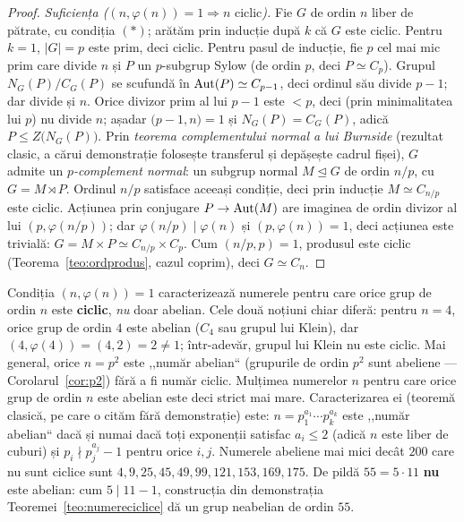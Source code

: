 \begin{proof}
\smallskip
\emph{Suficiența (}$(n,\varphi(n))=1\Rightarrow n$ ciclic\emph{).} Fie $G$ de ordin $n$ liber de pătrate, cu condiția $(\ast)$; arătăm prin inducție după $k$ că $G$ este ciclic. Pentru $k=1$, $|G|=p$ este prim, deci ciclic. Pentru pasul de inducție, fie $p$ cel mai mic prim care divide $n$ și $P$ un $p$-subgrup Sylow (de ordin $p$, deci $P\simeq C_p$). Grupul $N_G(P)/C_G(P)$ se scufundă în $\operatorname{Aut}(P)\simeq C_{p-1}$, deci ordinul său divide $p-1$; dar divide și $n$. Orice divizor prim al lui $p-1$ este $<p$, deci (prin minimalitatea lui $p$) nu divide $n$; așadar $\bigl(p-1,n\bigr)=1$ și $N_G(P)=C_G(P)$, adică $P\le Z\bigl(N_G(P)\bigr)$. Prin \emph{teorema complementului normal a lui Burnside} (rezultat clasic, a cărui demonstrație folosește transferul și depășește cadrul fișei), $G$ admite un \emph{$p$-complement normal}: un subgrup normal $M\trianglelefteq G$ de ordin $n/p$, cu $G=M\rtimes P$. Ordinul $n/p$ satisface aceeași condiție, deci prin inducție $M\simeq C_{n/p}$ este ciclic. Acțiunea prin conjugare $P\to\operatorname{Aut}(M)$ are imaginea de ordin divizor al lui $(p,\varphi(n/p))$; dar $\varphi(n/p)\mid\varphi(n)$ și $(p,\varphi(n))=1$, deci acțiunea este trivială: $G=M\times P\simeq C_{n/p}\times C_p$. Cum $(n/p,p)=1$, produsul este ciclic (Teorema~\ref{teo:ordprodus}, cazul coprim), deci $G\simeq C_n$.
\end{proof}

\begin{observatie}\label{obs:ciclicabelian}
Condiția $(n,\varphi(n))=1$ caracterizează numerele pentru care orice grup de ordin $n$ este \textbf{ciclic}, \emph{nu} doar abelian. Cele două noțiuni chiar diferă: pentru $n=4$, orice grup de ordin $4$ este abelian ($C_4$ sau grupul lui Klein), dar $(4,\varphi(4))=(4,2)=2\neq1$; într-adevăr, grupul lui Klein nu este ciclic. Mai general, orice $n=p^2$ este ,,număr abelian`` (grupurile de ordin $p^2$ sunt abeliene --- Corolarul~\ref{cor:p2}) fără a fi număr ciclic. Mulțimea numerelor $n$ pentru care orice grup de ordin $n$ este abelian este deci strict mai mare. Caracterizarea ei (teoremă clasică, pe care o cităm fără demonstrație) este: $n=p_1^{a_1}\cdots p_k^{a_k}$ este ,,număr abelian`` dacă și numai dacă toți exponenții satisfac $a_i\le2$ (adică $n$ este liber de cuburi) și $p_i\nmid p_j^{a_j}-1$ pentru orice $i,j$. Numerele abeliene mai mici decât $200$ care nu sunt ciclice sunt $4,9,25,45,49,99,121,153,169,175$. De pildă $55=5\cdot11$ \textbf{nu} este abelian: cum $5\mid11-1$, construcția din demonstrația Teoremei~\ref{teo:numereciclice} dă un grup neabelian de ordin $55$.
\end{observatie}

